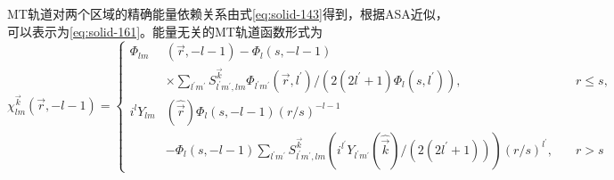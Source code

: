 MT轨道对两个区域的精确能量依赖关系由式\eqref{eq:solid-143}得到，根据ASA近似，可以表示为\eqref{eq:solid-161}。能量无关的MT轨道函数形式为
\begin{equation}
  \chi_{lm}^{\vec k}(\vec r,-l-1)=\left\{
  \begin{aligned}
    \Phi_{lm}&(\vec r,-l-1)-\Phi_l(s,-l-1)&\\
    &\times\sum_{l^{\prime}m^{\prime}}S_{l^{\prime}m^{\prime},lm}^{\vec k}\Phi_{l^{\prime}m^{\prime}}(\vec r,l^{\prime})/(2(2l^{\prime}+1)\Phi_l(s,l^{\prime})),&r\leqslant s,\\
    i^lY_{lm}&(\hat{\vec r})\Phi_l(s,-l-1)(r/s)^{-l-1}&\\
    &-\Phi_l(s,-l-1)\sum_{l^{\prime}m^{\prime}}S_{l^{\prime}m^{\prime},lm}^{\vec k}(i^{l^{\prime}}Y_{l^{\prime}m^{\prime}}(\hat{\vec k})/(2(2l^{\prime}+1)))(r/s)^{l^{\prime}},\quad&r>s
  \end{aligned}\right.
  \label{eq:solid-172}
\end{equation}

